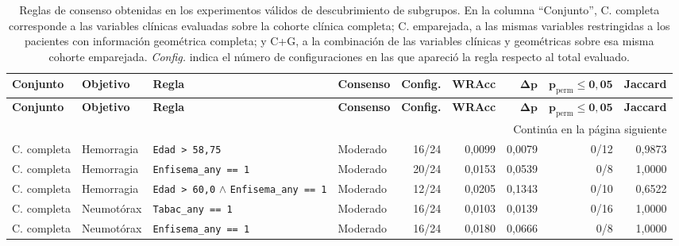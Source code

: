 \begin{landscape}
\scriptsize
\begin{longtable}{p{2.1cm}p{1.5cm}p{6.0cm}p{1.5cm}rrrrr}
\caption{Reglas de consenso obtenidas en los experimentos válidos de descubrimiento de subgrupos. En la columna ``Conjunto'', C. completa corresponde a las variables clínicas evaluadas sobre la cohorte clínica completa; C. emparejada, a las mismas variables restringidas a los pacientes con información geométrica completa; y C+G, a la combinación de las variables clínicas y geométricas sobre esa misma cohorte emparejada. \textit{Config.} indica el número de configuraciones en las que apareció la regla respecto al total evaluado.}
\label{tab:anexo-sd-reglas-consenso}\\
\toprule
\textbf{Conjunto} &
\textbf{Objetivo} &
\textbf{Regla} &
\textbf{Consenso} &
\textbf{Config.} &
\textbf{WRAcc} &
\(\boldsymbol{\Delta p}\) &
\(\boldsymbol{p_{\mathrm{perm}}\leq0{,}05}\) &
\textbf{Jaccard} \\
\midrule
\endfirsthead

\toprule
\textbf{Conjunto} &
\textbf{Objetivo} &
\textbf{Regla} &
\textbf{Consenso} &
\textbf{Config.} &
\textbf{WRAcc} &
\(\boldsymbol{\Delta p}\) &
\(\boldsymbol{p_{\mathrm{perm}}\leq0{,}05}\) &
\textbf{Jaccard} \\
\midrule
\endhead

\midrule
\multicolumn{9}{r}{Continúa en la página siguiente}\\
\endfoot

\bottomrule
\endlastfoot

C. completa & Hemorragia & \texttt{Edad > 58,75} & Moderado & 16/24 & 0,0099 & 0,0079 & 0/12 & 0,9873 \\

C. completa & Hemorragia & \texttt{Enfisema\_any == 1} & Moderado & 20/24 & 0,0153 & 0,0539 & 0/8 & 1,0000 \\

C. completa & Hemorragia & \texttt{Edad > 60,0} \(\land\) \texttt{Enfisema\_any == 1} & Moderado & 12/24 & 0,0205 & 0,1343 & 0/10 & 0,6522 \\

C. completa & Neumotórax & \texttt{Tabac\_any == 1} & Moderado & 16/24 & 0,0103 & 0,0139 & 0/16 & 1,0000 \\

C. completa & Neumotórax & \texttt{Enfisema\_any == 1} & Moderado & 16/24 & 0,0180 & 0,0666 & 0/8 & 1,0000 \\


\end{longtable}
\end{landscape}
